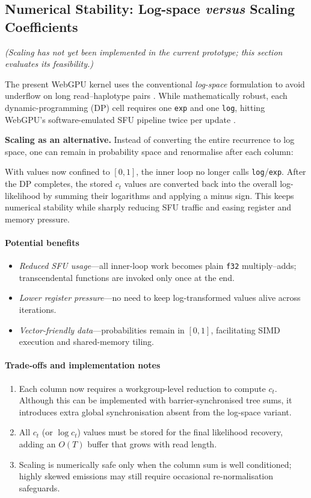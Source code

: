 \documentclass[PhD]{PHlab-thesis}
\begin{document}
\subsection{Numerical Stability: Log-space \emph{versus} Scaling Coefficients}

\textit{(Scaling has not yet been implemented in the current prototype; this section evaluates its feasibility.)}

The present WebGPU kernel uses the conventional \emph{log-space} formulation to avoid underflow on long read–haplotype pairs \cite{Durbin1998}.  
While mathematically robust, each dynamic-programming (DP) cell requires one \texttt{exp} and one \texttt{log}, hitting WebGPU's software-emulated SFU pipeline twice per update \cite{NVIDIA2023-cudaguide} .

\vspace{0.4em}
\noindent\textbf{Scaling as an alternative.}\;
Instead of converting the entire recurrence to log space, one can remain in probability space and renormalise after each column:

With values now confined to $[0,1]$, the inner loop no longer calls \texttt{log}/\texttt{exp}.  
After the DP completes, the stored $c_{t}$ values are converted back into the overall log-likelihood by summing their logarithms and applying a minus sign.  
This keeps numerical stability while sharply reducing SFU traffic and easing register and memory pressure.

\paragraph{Potential benefits}
\begin{itemize}
  \item \emph{Reduced SFU usage}—all inner-loop work becomes plain \texttt{f32} multiply–adds; transcendental functions are invoked only once at the end.
  \item \emph{Lower register pressure}—no need to keep log-transformed values alive across iterations.
  \item \emph{Vector-friendly data}—probabilities remain in $[0,1]$, facilitating SIMD execution and shared-memory tiling.
\end{itemize}

\paragraph{Trade-offs and implementation notes}
\begin{enumerate}
  \item Each column now requires a workgroup-level reduction to compute $c_{t}$.  
        Although this can be implemented with barrier-synchronised tree sums, it introduces extra global synchronisation absent from the log-space variant.
  \item All $c_{t}$ (or $\log c_{t}$) values must be stored for the final likelihood recovery, adding an $O(T)$ buffer that grows with read length.
  \item Scaling is numerically safe only when the column sum is well conditioned; highly skewed emissions may still require occasional re-normalisation safeguards.
\end{enumerate}
\end{document}
